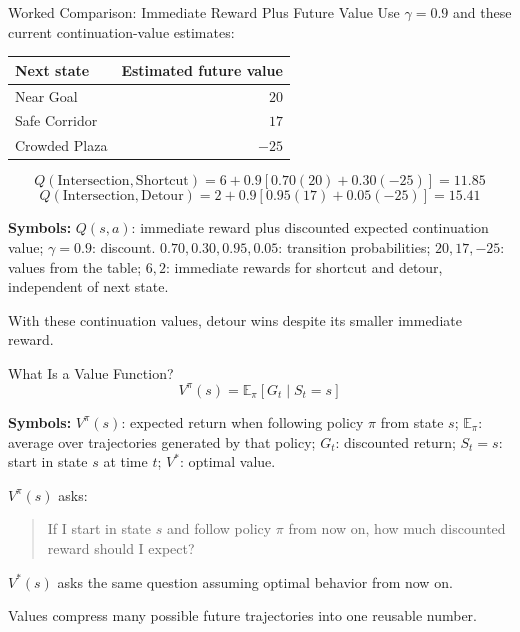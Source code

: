 \documentclass[aspectratio=169,10pt]{beamer}
\newcommand{\equationlegend}[1]{%
  \par\smallskip
  \begingroup
    \setlength{\fboxsep}{4pt}%
    \noindent\colorbox{DeckSoft}{%
      \parbox{\dimexpr\linewidth-2\fboxsep\relax}{%
        \footnotesize\textbf{Symbols:} #1%
      }%
    }\par
  \endgroup
  \smallskip
}
\begin{document}
\begin{frame}{Worked Comparison: Immediate Reward Plus Future Value}
  \small
  Use $\gamma=0.9$ and these current continuation-value estimates:
  \begin{center}
    \renewcommand{\arraystretch}{1.2}
    \begin{tabular}{l|r}
      \textbf{Next state} & \textbf{Estimated future value} \\\hline
      Near Goal & $20$ \\
      Safe Corridor & $17$ \\
      Crowded Plaza & $-25$
    \end{tabular}
  \end{center}
  \[
    Q(\text{Intersection},\text{Shortcut})=6+0.9[0.70(20)+0.30(-25)]=11.85
  \]
  \[
    Q(\text{Intersection},\text{Detour})=2+0.9[0.95(17)+0.05(-25)]=15.41
  \]
  \equationlegend{$Q(s,a)$: immediate reward plus discounted expected continuation value; $\gamma=0.9$: discount. $0.70,0.30,0.95,0.05$: transition probabilities; $20,17,-25$: values from the table; $6,2$: immediate rewards for shortcut and detour, independent of next state.}

  \begin{keyidea}
    With these continuation values, detour wins despite its smaller immediate reward.
  \end{keyidea}
\end{frame}

\begin{frame}[shrink=10]{What Is a Value Function?}
  \[
    V^\pi(s)=\mathbb{E}_\pi\left[G_t\mid S_t=s\right]
  \]
  \equationlegend{$V^\pi(s)$: expected return when following policy $\pi$ from state $s$; $\mathbb{E}_\pi$: average over trajectories generated by that policy; $G_t$: discounted return; $S_t=s$: start in state $s$ at time $t$; $V^*$: optimal value.}

  $V^\pi(s)$ asks:
  \begin{quote}
    If I start in state $s$ and follow policy $\pi$ from now on, how much discounted reward should I expect?
  \end{quote}

  $V^*(s)$ asks the same question assuming optimal behavior from now on.

  \begin{keyidea}
    Values compress many possible future trajectories into one reusable number.
  \end{keyidea}
\end{frame}
\end{document}
